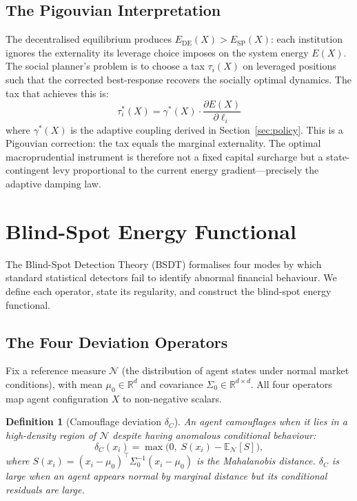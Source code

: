 \documentclass[11pt]{article}
\newtheorem{definition}[theorem]{Definition}
\theoremstyle{definition}
\newcommand{\R}{\mathbb{R}}
\newcommand{\E}{\mathbb{E}}
\begin{document}
\subsection{The Pigouvian Interpretation}

The decentralised equilibrium produces $E_{\mathrm{DE}}(X) > E_{\mathrm{SP}}(X)$: each
institution ignores the externality its leverage choice imposes on the system
energy $E(X)$.  The social planner's problem is to choose a tax $\tau_i(X)$ on
leveraged positions such that the corrected best-response recovers the socially
optimal dynamics.  The tax that achieves this is:
\[
  \tau_i^*(X) = \gamma^*(X) \cdot \frac{\partial E(X)}{\partial \ell_i}
\]
where $\gamma^*(X)$ is the adaptive coupling derived in Section~\ref{sec:policy}.
This is a Pigouvian correction: the tax equals the marginal externality.  The
optimal macroprudential instrument is therefore not a fixed capital surcharge but
a state-contingent levy proportional to the current energy gradient---precisely
the adaptive damping law.

\section{Blind-Spot Energy Functional}
\label{sec:bsdt}

The Blind-Spot Detection Theory (BSDT) formalises four modes by which standard
statistical detectors fail to identify abnormal financial behaviour.  We define each
operator, state its regularity, and construct the blind-spot energy functional.

\subsection{The Four Deviation Operators}

Fix a reference measure $\mathcal{N}$ (the distribution of agent states under normal
market conditions), with mean $\mu_0 \in \R^d$ and covariance $\Sigma_0 \in \R^{d \times d}$.
All four operators map agent configuration $X$ to non-negative scalars.

\begin{definition}[Camouflage deviation $\delta_C$]
An agent camouflages when it lies in a high-density region of $\mathcal{N}$ despite
having anomalous \emph{conditional} behaviour:
\[
  \delta_C(x_i) = \max\bigl(0,\; S(x_i) - \E_{\mathcal{N}}[S]\bigr),
\]
where $S(x_i) = (x_i - \mu_0)^\top \Sigma_0^{-1}(x_i - \mu_0)$ is the
Mahalanobis distance. $\delta_C$ is large when an agent appears normal by marginal
distance but its conditional residuals are large.
\end{definition}
\end{document}
